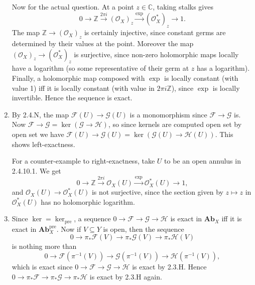 \documentclass{report}
\newcommand{\cat}[1]{\mathbf{#1}} %
\newcommand{\pre}{{\mathrm{pre}}} %
\renewcommand{\O}{\mathscr{O}} %
\newcommand{\scrF}{\mathscr{F}}
\newcommand{\scrG}{\mathscr{G}}
\newcommand{\scrH}{\mathscr{H}}
\newcommand{\Z}{\mathbb{Z}}
\newcommand{\C}{\mathbb{C}}
\begin{document}
\begin{enumerate}[label=\textbf{2.6.\Alph*.}]
	      Now for the actual question. At a point $z\in\C$, taking stalks gives
	      \begin{equation*}
		      0 \to \Z
		      \xrightarrow{2\pi i} (\O_X)_z
		      \xrightarrow\exp (\O_X^*)_z \to 1.
	      \end{equation*}
	      The map $\Z\to(\O_X)_z$ is certainly injective, since constant germs are
	      determined by their values at the point. Moreover the map
	      $(\O_X)_z\to(\O_X^*)_z$ is surjective, since non-zero holomorphic maps
	      locally have a logarithm (so some representative of their germ at $z$
	      has a logarithm). Finally, a holomorphic map composed with $\exp$ is
	      locally constant (with value 1) iff it is locally constant (with value
	      in $2\pi i\Z$), since $\exp$ is locally invertible. Hence the sequence
	      is exact.

	\item By 2.4.N, the map $\scrF(U)\to\scrG(U)$ is a monomorphism since $\scrF\to\scrG$
	      is. Now $\scrF\to\scrG=\ker(\scrG\to\scrH)$, so since kernels are computed open set
	      by open set we have $\scrF(U)\to\scrG(U)=\ker(\scrG(U)\to\scrH(U))$. This shows
	      left-exactness.

	      For a counter-example to right-exactness, take $U$ to be an open annulus
	      in 2.4.10.1. We get
	      \begin{equation*}
		      0 \to \Z \xrightarrow{2\pi i} \O_X(U) \xrightarrow\exp \O_X^*(U) \to 1,
	      \end{equation*}
	      and $\O_X(U)\to\O_X^*(U)$ is not surjective, since the section given by
	      $z\mapsto z$ in $\O_X^*(U)$ has no holomorphic logarithm.

	\item Since $\ker=\ker_\pre$, a sequence $0\to\scrF\to\scrG\to\scrH$ is exact in
	      $\cat{Ab}_X$ iff it  is exact in $\cat{Ab}_X^\pre$. Now if
	      $V\subseteq Y$ is open, then the sequence
	      \begin{equation*}
		      0 \to \pi_*\scrF(V) \to \pi_*\scrG(V) \to \pi_*\scrH(V)
	      \end{equation*}
	      is nothing more than
	      \begin{equation*}
		      0 \to \scrF(\pi^{-1}(V)) \to \scrG(\pi^{-1}(V)) \to \scrH(\pi^{-1}(V)),
	      \end{equation*}
	      which is exact since $0\to\scrF\to\scrG\to\scrH$ is exact by 2.3.H. Hence
	      $0\to\pi_*\scrF\to\pi_*\scrG\to\pi_*\scrH$ is exact by 2.3.H again.


\end{enumerate}
\end{document}
